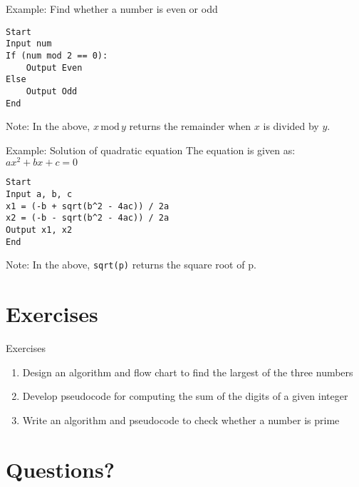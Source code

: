 \documentclass[12pt, aspectratio=169]{beamer}
\begin{document}
    \begin{frame}[fragile]{Example: Find whether a number is even or odd}
        \begin{verbatim}
Start
Input num
If (num mod 2 == 0):
    Output Even
Else
    Output Odd
End
        \end{verbatim}

        Note: In the above, $x \, \mathrm{mod} \, y$ returns the remainder when $x$ is divided by $y$.
    \end{frame}


    \begin{frame}[fragile]{Example: Solution of quadratic equation}
        The equation is given as: $ax^2 + bx + c = 0$
        \begin{verbatim}
Start
Input a, b, c
x1 = (-b + sqrt(b^2 - 4ac)) / 2a
x2 = (-b - sqrt(b^2 - 4ac)) / 2a
Output x1, x2
End
        \end{verbatim}

        Note: In the above, \verb|sqrt(p)| returns the square root of p.
    \end{frame}


    \section{Exercises}

    \begin{frame}{Exercises}
    \begin{enumerate}
        \item Design an algorithm and flow chart to find the largest of the three numbers
        \item Develop pseudocode for computing the sum of the digits of a given integer
        \item Write an algorithm and pseudocode to check whether a number is prime
    \end{enumerate}
    \end{frame}

    \section*{Questions?}
\end{document}
